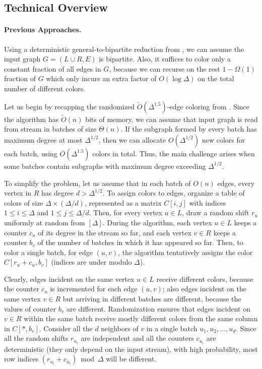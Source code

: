 \documentclass[11pt,a4paper]{article}
\begin{document}
\subsection{Technical Overview}

\paragraph*{Previous Approaches.} Using a deterministic general-to-bipartite reduction from \cite{ghosh2024low}, we can assume the input graph $G = (L\cup R, E)$ is bipartite. Also, it suffices to color only a constant fraction of all edges in $G$, because we can recurse on the rest $1 - \Omega(1)$ fraction of $G$ which only incurs an extra factor of $O(\log\Delta)$ on the total number of different colors.

Let us begin by recapping the randomized $\tilde{O}(\Delta^{1.5})$-edge coloring from \cite{behnezhad2023streaming}. Since the algorithm has $\tilde{O}(n)$ bits of memory, we can assume that input graph is read from stream in batches of size $\Theta(n)$. If the subgraph formed by every batch has maximum degree at most $\Delta^{1/2}$, then we can allocate $O(\Delta^{1/2})$ new colors for each batch, using $O(\Delta^{1.5})$ colors in total. Thus, the main challenge arises when some batches contain subgraphs with maximum degree exceeding $\Delta^{1/2}$.

To simplify the problem, let us assume that in each batch of $O(n)$ edges, every vertex in $R$ has degree $d > \Delta^{1/2}$. To assign colors to edges, organize a table of colors of size $\Delta\times (\Delta/d)$, represented as a matrix $C[i, j]$ with indices $ 1\leq i\leq \Delta$ and $1\leq j\leq \Delta /d$. Then, for every vertex $u\in L$, draw a random shift $r_u$ uniformly at random from $[\Delta]$. During the algorithm, each vertex $u\in L$ keeps a counter $c_u$ of its degree in the stream so far, and each vertex $v\in R$ keeps a counter $b_v$ of the number of batches in which it has appeared so far. Then, to color a single batch, for edge $(u, v)$, the algorithm tentatively assigns the color $C[r_u + c_u, b_v]$ (indices are under modulo $\Delta$).

Clearly, edges incident on the same vertex $u\in L$ receive different colors, because the counter $c_u$ is incremented for each edge $(u, v)$; also edges incident on the same vertex $v\in R$ but arriving in different batches are different, because the values of counter $b_v$ are different. Randomization ensures that edges incident on $v\in R$ within the same batch receive mostly  different colors from the same column in $C[*, b_v]$. Consider all the $d$ neighbors of $v$ in a single batch $u_1, u_2, \ldots, u_d$. Since all the random shifts $r_{u_i}$ are independent and all the counters $c_{u_i}$ are deterministic (they only depend on the input stream), with high probability, most row indices $(r_{u_i} + c_{u_i}) \bmod \Delta$ will be different. 
\end{document}
